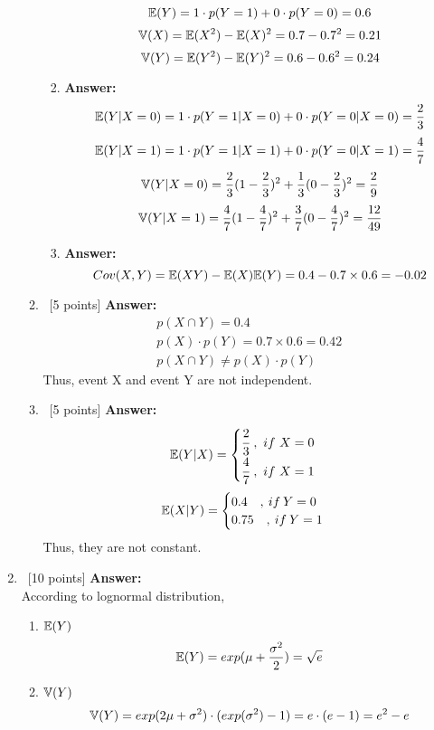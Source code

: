 \documentclass[12pt, fullpage,letterpaper]{article}
\begin{document}
\begin{enumerate}
\begin{enumerate}
\begin{enumerate}
\[            \mathbb{E}(Y) = 1 \cdot p(Y=1) + 0 \cdot p(Y=0) = 0.6
            \]
            \[
            \mathbb{V}(X) = \mathbb{E}(X^2) - \mathbb{E}(X)^2 = 0.7 - 0.7^2 = 0.21
            \]
            \[
            \mathbb{V}(Y) = \mathbb{E}(Y^2) - \mathbb{E}(Y)^2 = 0.6 - 0.6^2 = 0.24
            \]            
            \item
            \textbf{Answer:}
            \[
            \mathbb{E}(Y|X=0) = 1 \cdot p(Y=1|X=0) + 0 \cdot p(Y=0|X=0) = \frac{2}{3}
            \]
            \[
            \mathbb{E}(Y|X=1) = 1 \cdot p(Y=1|X=1) + 0 \cdot p(Y=0|X=1) = \frac{4}{7}
            \]
            \[
            \mathbb{V}(Y|X=0) = \frac{2}{3}(1-\frac{2}{3})^2 + \frac{1}{3}(0 - \frac{2}{3})^2 = \frac{2}{9}
            \]
            \[
            \mathbb{V}(Y|X=1) = \frac{4}{7}(1-\frac{4}{7})^2 + \frac{3}{7}(0 - \frac{4}{7})^2 = \frac{12}{49}
            \]    
            \item
            \textbf{Answer:}
            \[
            Cov(X, Y) = \mathbb{E}(XY) - \mathbb{E}(X)\mathbb{E}(Y) = 0.4 - 0.7 \times 0.6 = -0.02
            \]
            \end{enumerate}
            \item~[5 points]
            \textbf{Answer:}
            \setcounter{equation}{0}
            \begin{gather}
            p(X\cap Y) = 0.4\\
            p(X) \cdot p(Y) = 0.7 \times 0.6 = 0.42\\
            p(X\cap Y) \neq p(X) \cdot p(Y)
            \end{gather}
            Thus, event X and event Y are not independent.
            \item~[5 points] 
            \textbf{Answer:}
            \[
            \mathbb{E}(Y|X) = 
            \begin{cases}
            \cfrac{2}{3}\ ,\ if\ X=0\\
            \cfrac{4}{7}\ ,\ if\ X=1
            \end{cases}
            \]
            \[
            \mathbb{E}(X|Y) = 
            \begin{cases}
            0.4\quad,\: if\: Y=0\\
            0.75\quad,\: if\: Y=1
            \end{cases}
            \]
            Thus, they are not constant.
        \end{enumerate}
        
\item~[10 points] 
\textbf{Answer:}\\
According to lognormal distribution,
\begin{enumerate}
\item $\mathbb{E}(Y)$
\[
\mathbb{E}(Y) = exp(\mu + \frac{\sigma^2}{2}) = \sqrt{e}
\]
\item $\mathbb{V}(Y)$
\[
\mathbb{V}(Y) = exp(2\mu + \sigma^2) \cdot (exp(\sigma^2) - 1) = e \cdot (e - 1) = e^2 - e
\]
\end{enumerate}


\end{enumerate}
\end{document}
